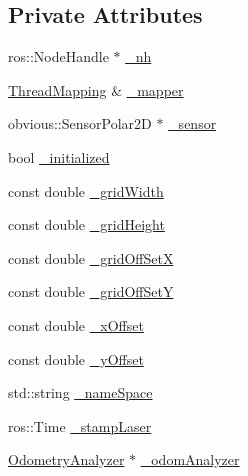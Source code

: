 \subsection*{Private Attributes}
\begin{DoxyCompactItemize}
\item 
ros\-::\-Node\-Handle $\ast$ \hyperlink{classohm__tsd__slam__ref_1_1ThreadLocalize_a339ec43d3843e2049120afd424a636f7}{\-\_\-nh}
\item 
\hyperlink{classohm__tsd__slam__ref_1_1ThreadMapping}{Thread\-Mapping} \& \hyperlink{classohm__tsd__slam__ref_1_1ThreadLocalize_a73a2ed65f92fbf13e82e7b00e8354c13}{\-\_\-mapper}
\item 
obvious\-::\-Sensor\-Polar2\-D $\ast$ \hyperlink{classohm__tsd__slam__ref_1_1ThreadLocalize_ad08189f4b2c11aa3f2d75384d89088f8}{\-\_\-sensor}
\item 
bool \hyperlink{classohm__tsd__slam__ref_1_1ThreadLocalize_a936d63f4a95f0102070be527a2636f8f}{\-\_\-initialized}
\item 
const double \hyperlink{classohm__tsd__slam__ref_1_1ThreadLocalize_a09c5ac4604a298725984646e683aa600}{\-\_\-grid\-Width}
\item 
const double \hyperlink{classohm__tsd__slam__ref_1_1ThreadLocalize_af9493e2cbbce37f693bbe632374d0d2a}{\-\_\-grid\-Height}
\item 
const double \hyperlink{classohm__tsd__slam__ref_1_1ThreadLocalize_a74254a193f989fd948778e780a340b9c}{\-\_\-grid\-Off\-Set\-X}
\item 
const double \hyperlink{classohm__tsd__slam__ref_1_1ThreadLocalize_ab12390e3a1727f9d1c47fc96747bd96c}{\-\_\-grid\-Off\-Set\-Y}
\item 
const double \hyperlink{classohm__tsd__slam__ref_1_1ThreadLocalize_a2bfa898645a8b505fbc317829da277cf}{\-\_\-x\-Offset}
\item 
const double \hyperlink{classohm__tsd__slam__ref_1_1ThreadLocalize_afd9255f70ea924f91b0e628d20245803}{\-\_\-y\-Offset}
\item 
std\-::string \hyperlink{classohm__tsd__slam__ref_1_1ThreadLocalize_ae67e48692aef6eadb8a12c2c89362c94}{\-\_\-name\-Space}
\item 
ros\-::\-Time \hyperlink{classohm__tsd__slam__ref_1_1ThreadLocalize_acf1975963191b84dd1fda914a4cc15ae}{\-\_\-stamp\-Laser}
\item 
\hyperlink{classohm__tsd__slam__ref_1_1OdometryAnalyzer}{Odometry\-Analyzer} $\ast$ \hyperlink{classohm__tsd__slam__ref_1_1ThreadLocalize_a719b8e1a97ec5ba8e859f24b416699a0}{\-\_\-odom\-Analyzer}

\end{DoxyCompactItemize}

